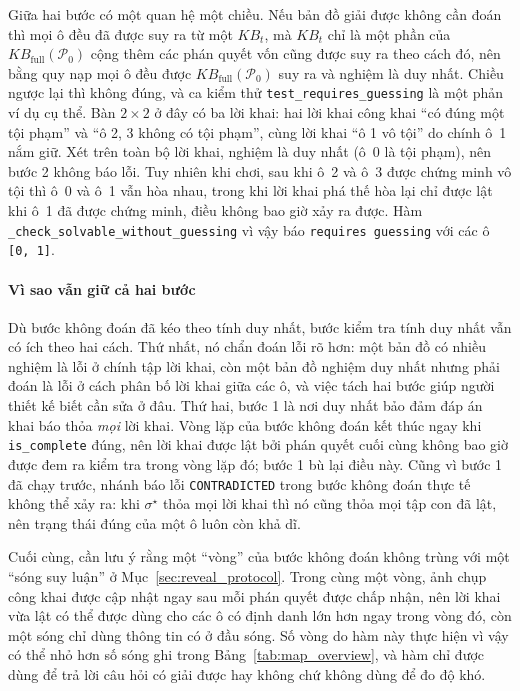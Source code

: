 \begin{sloppypar}
Giữa hai bước có một quan hệ một chiều. Nếu bản đồ giải được không cần đoán thì
mọi ô đều đã được suy ra từ một $\mathit{KB}_t$, mà $\mathit{KB}_t$ chỉ là một
phần của $\mathit{KB}_{\mathrm{full}}(\mathcal{P}_0)$ cộng thêm các phán quyết
vốn cũng được suy ra theo cách đó, nên bằng quy nạp mọi ô đều được
$\mathit{KB}_{\mathrm{full}}(\mathcal{P}_0)$ suy ra và nghiệm là duy nhất. Chiều
ngược lại thì không đúng, và ca kiểm thử \texttt{test\_requires\_guessing} là
một phản ví dụ cụ thể. Bàn $2\times2$ ở đây có ba lời khai: hai lời khai công
khai ``có đúng một tội phạm'' và ``ô 2, 3 không có tội phạm'', cùng lời khai
``ô 1 vô tội'' do chính ô~1 nắm giữ. Xét trên toàn bộ lời khai, nghiệm là duy
nhất (ô~0 là tội phạm), nên bước 2 không báo lỗi. Tuy nhiên khi chơi, sau khi ô~2
và ô~3 được chứng minh vô tội thì ô~0 và ô~1 vẫn hòa nhau, trong khi lời khai
phá thế hòa lại chỉ được lật khi ô~1 đã được chứng minh, điều không bao giờ xảy
ra được. Hàm \texttt{\_check\_solvable\_without\_guessing} vì vậy báo
\texttt{requires guessing} với các ô \texttt{[0, 1]}.

\paragraph{Vì sao vẫn giữ cả hai bước}
Dù bước không đoán đã kéo theo tính duy nhất, bước kiểm tra tính duy nhất vẫn
có ích theo hai cách. Thứ nhất, nó chẩn đoán lỗi rõ hơn: một bản đồ có nhiều
nghiệm là lỗi ở chính tập lời khai, còn một bản đồ nghiệm duy nhất nhưng phải
đoán là lỗi ở cách phân bố lời khai giữa các ô, và việc tách hai bước giúp người
thiết kế biết cần sửa ở đâu. Thứ hai, bước 1 là nơi duy nhất bảo đảm đáp án khai
báo thỏa \emph{mọi} lời khai. Vòng lặp của bước không đoán kết thúc ngay khi
\texttt{is\_complete} đúng, nên lời khai được lật bởi phán quyết cuối cùng không
bao giờ được đem ra kiểm tra trong vòng lặp đó; bước 1 bù lại điều này. Cũng vì
bước 1 đã chạy trước, nhánh báo lỗi \texttt{CONTRADICTED} trong bước không đoán
thực tế không thể xảy ra: khi $\sigma^\star$ thỏa mọi lời khai thì nó cũng thỏa
mọi tập con đã lật, nên trạng thái đúng của một ô luôn còn khả dĩ.

Cuối cùng, cần lưu ý rằng một ``vòng'' của bước không đoán không trùng với một
``sóng suy luận'' ở Mục~\ref{sec:reveal_protocol}. Trong cùng một vòng, ảnh chụp
công khai được cập nhật ngay sau mỗi phán quyết được chấp nhận, nên lời khai vừa
lật có thể được dùng cho các ô có định danh lớn hơn ngay trong vòng đó, còn một
sóng chỉ dùng thông tin có ở đầu sóng. Số vòng do hàm này thực hiện vì vậy có
thể nhỏ hơn số sóng ghi trong Bảng~\ref{tab:map_overview}, và hàm chỉ được dùng
để trả lời câu hỏi có giải được hay không chứ không dùng để đo độ khó.
\end{sloppypar}
